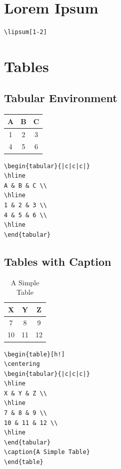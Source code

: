\documentclass[12pt]{article}
\begin{document}
\section{Lorem Ipsum}

\lipsum[1-2]

\begin{verbatim}
\lipsum[1-2]
\end{verbatim}

\section{Tables}
\subsection{Tabular Environment}
\begin{tabular}{|c|c|c|}
\hline
A & B & C \\
\hline
1 & 2 & 3 \\
4 & 5 & 6 \\
\hline
\end{tabular}

\begin{verbatim}
\begin{tabular}{|c|c|c|}
\hline
A & B & C \\
\hline
1 & 2 & 3 \\
4 & 5 & 6 \\
\hline
\end{tabular}
\end{verbatim}  


\subsection{Tables with Caption}
\begin{table}[h!]
\centering
\begin{tabular}{|c|c|c|}
\hline
X & Y & Z \\
\hline
7 & 8 & 9 \\
10 & 11 & 12 \\
\hline
\end{tabular}
\caption{A Simple Table}
\end{table}

\begin{verbatim}
\begin{table}[h!]
\centering
\begin{tabular}{|c|c|c|}
\hline
X & Y & Z \\
\hline
7 & 8 & 9 \\
10 & 11 & 12 \\
\hline
\end{tabular}
\caption{A Simple Table}
\end{table}
\end{verbatim}
\end{document}
